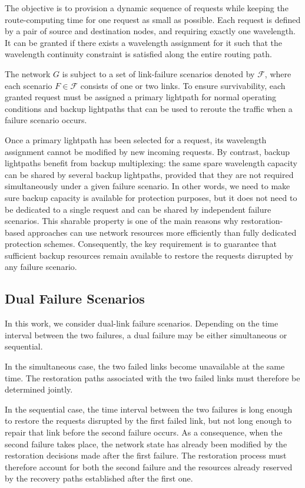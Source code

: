 \documentclass[conference]{IEEEtran}
\def \FailureSet      {\mathcal{F}}
\def \FailureIdx      {F}
\begin{document}
The objective is to provision a dynamic sequence of requests while keeping the route-computing time for one request as small as possible. 
Each request is defined by a pair of source and destination nodes, and requiring exactly one wavelength. 
It can be granted if there exists a wavelength assignment for it such that the wavelength continuity constraint is satisfied along the entire routing path.

The network $G$ is subject to a set of link-failure scenarios denoted by $\FailureSet$, where each scenario $\FailureIdx \in \FailureSet$ consists of one or two links. To ensure survivability, each granted request must be assigned a primary lightpath for normal operating conditions and backup lightpaths that can be used to reroute the traffic when a failure scenario occurs.

Once a primary lightpath has been selected for a request, its wavelength assignment cannot be modified by new incoming requests. 
By contrast, backup lightpaths benefit from backup multiplexing: the same spare wavelength capacity can be shared by several backup lightpaths, provided that they are not required simultaneously under a given failure scenario. 
In other words, we need to make sure backup capacity is available for protection purposes, but it does not need to be dedicated to a single request and can be shared by independent failure scenarios.  This sharable property is one of the main reasons why restoration-based approaches can use network resources more efficiently than fully dedicated protection schemes. Consequently, the key requirement is to guarantee that sufficient backup resources remain available to restore the requests disrupted by any failure scenario.


\subsection{Dual Failure Scenarios}
\label{sec: dual_FS}

In this work, we consider dual-link failure scenarios. Depending on the time interval between the two failures, a dual failure may be either simultaneous or sequential.

In the simultaneous case, the two failed links become unavailable at the same time. The restoration paths associated with the two failed links must therefore be determined jointly.

In the sequential case, the time interval between the two failures is long enough to restore the requests disrupted by the first failed link, but not long enough to repair that link before the second failure occurs. 
As a consequence, when the second failure takes place, the network state has already been modified by the restoration decisions made after the first failure. The restoration process must therefore account for both the second failure and the resources already reserved by the recovery paths established after the first one.
\end{document}
